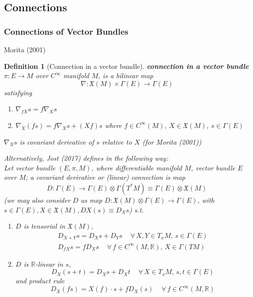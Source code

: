 \documentclass[10pt]{amsart}
\newtheorem{definition}{Definition}
\begin{document}
\begin{multicols*}{2}
\part{Connections}

\section{Connections of Vector Bundles}

Morita (2001) \cite{Mori2001}

\begin{definition}[Connection in a vector bundle]
	\textbf{connection in a vector bundle} $\pi : E \to M$ over $C^{\infty}$ manifold $M$, is a bilinear map
	\[
	\nabla : \mathfrak{X}(M) \times \Gamma(E) \to \Gamma(E)
	\]
	satisfying
	\begin{enumerate}
		\item[(i)] $\nabla_{fX} s = f\nabla_X s$
		\item[(ii)] $\nabla_X(fs) = f\nabla_Xs + (Xf)s$ where $f\in C^{\infty}(M)$, $X \in \mathfrak{X}(M)$, $s\in \Gamma(E)$
	\end{enumerate}
$\nabla_Xs$ is covariant derivative of $s$ relative to $X$ (for Morita (2001)\cite{Mori2001})

Alternatively, Jost (2017) \cite{Jost2017} defines in the following way: \\

Let vector bundle $(E, \pi, M)$, where differentiable manifold $M$, vector bundle $E$ over $M$; a covariant derivative or (linear) connection is map
\begin{equation}
	D:\Gamma(E) \to \Gamma(E) \otimes \Gamma(T^*M) \equiv \Gamma(E) \otimes \mathfrak{X}(M)
\end{equation}
(we may also consider $D$ as map $D: \mathfrak{X}(M) \otimes \Gamma(E) \to \Gamma(E)$, with $s \in \Gamma(E), X \in \mathfrak{X}(M), DX(s) \equiv D_X s$) s.t.

\begin{enumerate}
	\item $D$ is tensorial in $\mathfrak{X}(M)$, 
	\begin{equation}
		\begin{gathered}
			D_{X +Y} s = D_X s + D_Y s \quad \, \forall \, X,Y \in T_xM, \, s\in \Gamma(E) \\
			D_{fX} s = fD_X s \quad \, \forall \, f \in C^{\infty}(M, \mathbb{R}), \, X \in \Gamma(TM)
		\end{gathered}
	\end{equation}
\item $D$ is $\mathbb{R}$-linear in $s$, 
\begin{equation}
	D_X(s+t ) = D_X s + D_X t \quad \, \forall \, X \in T_xM , \, s,t \in \Gamma(E) 
\end{equation}
and product rule
\begin{equation}
	D_X(fs) = X(f) \cdot s + fD_X(s) \quad \, \forall \, f \in C^{\infty} (M, \mathbb{R})
\end{equation}
\end{enumerate}


\end{definition}
\end{multicols*}
\end{document}
